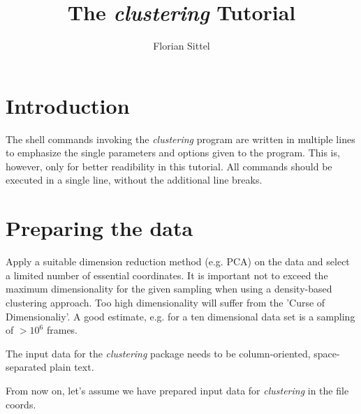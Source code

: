 \documentclass[12pt,a4paper,twoside,english,fleqn]{article}
\begin{document}
\lstset{language=bash}
\lstset{basicstyle=\ttfamily}
\lstset{columns=fullflexible}


\title{\vspace{-3cm}The \emph{clustering} Tutorial}
\author{Florian Sittel}
\maketitle

\section{Introduction}
The shell commands invoking the \emph{clustering} program are written in
multiple lines to emphasize the single parameters and options given to the
program. This is, however, only for better readibility in this tutorial.
All commands should be executed in a single line, without the additional line
breaks.


\section{Preparing the data}
Apply a suitable dimension reduction method (e.g. PCA) on the data and select a
limited number of essential coordinates.
It is important not to exceed the maximum dimensionality for the given sampling
when using a density-based clustering approach.
Too high dimensionality will suffer from the 'Curse of Dimensionaliy'.
A good estimate, e.g. for a ten dimensional data set is a sampling of $> 10^6$
frames.

The input data for the \emph{clustering} package needs to be column-oriented,
space-separated plain text.

From now on, let's assume we have prepared input data for \emph{clustering} in
the file {\ttfamily coords}.
\end{document}
